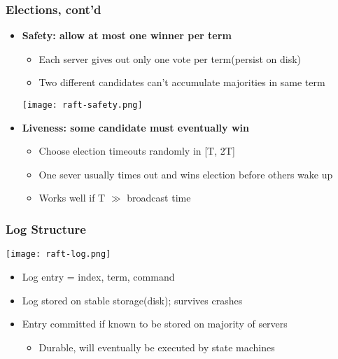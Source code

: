 \begin{frame}
    \frametitle{Elections, cont'd}
    \begin{itemize}
        \item \textbf{\alert{Safety}: allow at most one winner per term}
            \begin{itemize}
                \item Each server gives out only one vote per term(persist on disk)
                \item Two different candidates can't accumulate majorities in same term
            \end{itemize}
        \texttt{[image: raft-safety.png]}
        \item \textbf{\alert{Liveness}: some candidate must eventually win}
            \begin{itemize}
                \item Choose election timeouts randomly in [T, 2T]
                \item One sever usually times out and wins election before others wake up
                \item Works well if T $\gg$ broadcast time
            \end{itemize}
    \end{itemize}
\end{frame}

\begin{frame}
    \frametitle{Log Structure}
    \texttt{[image: raft-log.png]}
    \begin{itemize}
        \item Log entry = index, term, command
        \item Log stored on stable storage(disk); survives crashes
        \item Entry \alert{committed} if known to be stored on majority of servers
            \begin{itemize}
                \item Durable, will eventually be executed by state machines
            \end{itemize}
    \end{itemize}
\end{frame}

